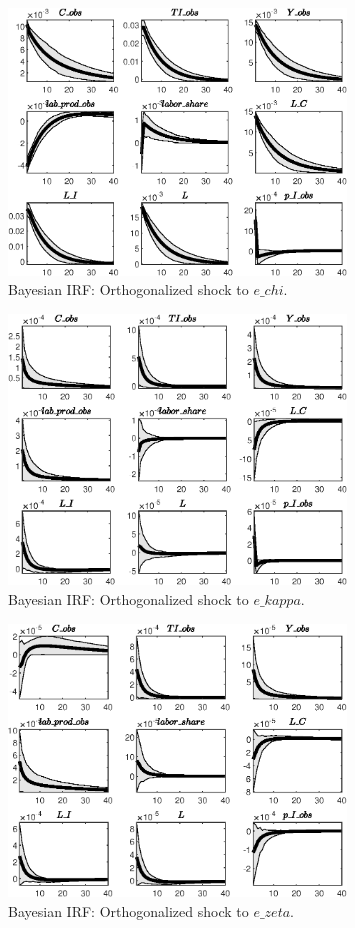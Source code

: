 \begin{figure}[H]
\centering 
\includegraphics[width=0.80\textwidth]{directed_search_est_alt_obs/Output/directed_search_est_alt_obs_Bayesian_IRF_e_chi_1}
\caption{Bayesian IRF: Orthogonalized shock to $e\_chi$.}
\label{Fig:BayesianIRF:e_chi:1}
\end{figure}
 
\begin{figure}[H]
\centering 
\includegraphics[width=0.80\textwidth]{directed_search_est_alt_obs/Output/directed_search_est_alt_obs_Bayesian_IRF_e_kappa_1}
\caption{Bayesian IRF: Orthogonalized shock to $e\_kappa$.}
\label{Fig:BayesianIRF:e_kappa:1}
\end{figure}
 
\begin{figure}[H]
\centering 
\includegraphics[width=0.80\textwidth]{directed_search_est_alt_obs/Output/directed_search_est_alt_obs_Bayesian_IRF_e_zeta_1}
\caption{Bayesian IRF: Orthogonalized shock to $e\_zeta$.}
\label{Fig:BayesianIRF:e_zeta:1}
\end{figure}
 
